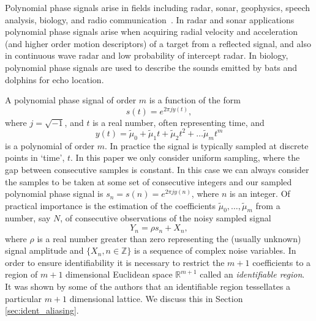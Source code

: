 \documentclass[aap]{imsart}
\newcommand{\reals}{{\mathbb R}}
\newcommand{\ints}{{\mathbb Z}}
\begin{document}
Polynomial phase signals arise in fields including radar, sonar, geophysics, speech analysis, biology, and radio communication~\cite{Hlawatsch_lin_quad_time_freq_spmag_1992,Ridleyspeechpolyphase1989, Suga_1975_bats_echolocation, Moss_2005echolocation}. In radar and sonar applications polynomial phase signals arise when acquiring radial velocity and acceleration (and higher order motion descriptors) of a target from a reflected signal, and also in continuous wave radar and low probability of intercept radar.  In biology, polynomial phase signals are used to describe the sounds emitted by bats and dolphins for echo location.  

A polynomial phase signal of order $m$ is a function of the form
\[
s(t) = e^{2\pi j y(t)},
\]
where $j = \sqrt{-1}$, and $t$ is a real number, often representing time, and 
\[
y(t) = \tilde{\mu}_0 +\tilde{\mu}_1 t + \tilde{\mu}_2 t^2 + \dots \tilde{\mu}_m t^m
\]
is a polynomial of order $m$.  In practice the signal is typically sampled at discrete points in `time', $t$. In this paper we only consider uniform sampling, where the gap between consecutive samples is constant. In this case we can always consider the samples to be taken at some set of consecutive integers and our sampled polynomial phase signal is $s_n = s(n) = e^{2\pi j y(n)}$, where $n$ is an integer.  Of practical importance is the estimation of the coefficients $\tilde{\mu}_0, \dots, \tilde{\mu}_m$ from a number, say $N$, of consecutive observations of the noisy sampled signal
\begin{equation}\label{eq:Y_nsamplednoisey}
Y_n = \rho s_n + X_n,
\end{equation}
where $\rho$ is a real number greater than zero representing the (usually unknown) signal amplitude and $\{X_n, n \in \ints\}$ is a sequence of complex noise variables. In order to ensure identifiability it is necessary to restrict the $m+1$ coefficients to a region of $m+1$ dimensional Euclidean space $\reals^{m+1}$ called an \emph{identifiable region}.  It was shown by some of the authors \cite{McKilliam2009IndentifiabliltyAliasingPolyphase} that an identifiable region tessellates a particular $m+1$ dimensional lattice.  We discuss this in Section \ref{sec:ident_aliasing}.
\end{document}
